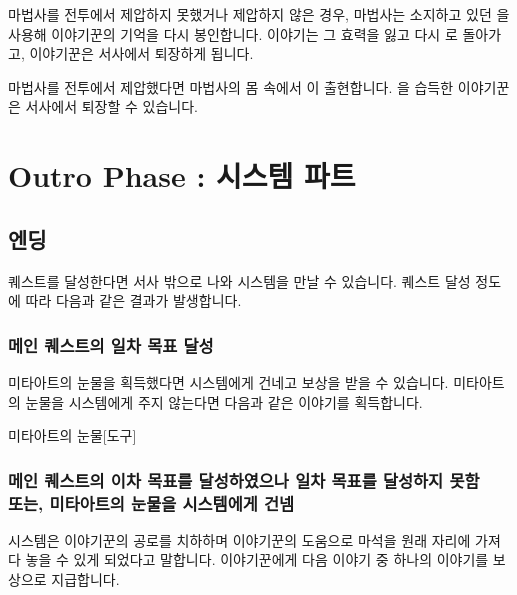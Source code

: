 \documentclass{report}
\begin{document}
	마법사를 전투에서 제압하지 못했거나 제압하지 않은 경우, 마법사는 소지하고 있던 을 사용해 이야기꾼의 기억을 다시 봉인합니다.  이야기는 그 효력을 잃고 다시 로 돌아가고, 이야기꾼은 서사에서 퇴장하게 됩니다.
	
	마법사를 전투에서 제압했다면 마법사의 몸 속에서 이 출현합니다. 을 습득한 이야기꾼은 서사에서 퇴장할 수 있습니다.
	
	
	
	\section{Outro Phase : 시스템 파트}
	
	\subsection{엔딩}
	
	퀘스트를 달성한다면 서사 밖으로 나와 시스템을 만날 수 있습니다. 퀘스트 달성 정도에 따라 다음과 같은 결과가 발생합니다.
	
	
	\subsubsection{메인 퀘스트의 일차 목표 달성}
	
	미타아트의 눈물을 획득했다면 시스템에게 건네고 보상을 받을 수 있습니다. 미타아트의 눈물을 시스템에게 주지 않는다면 다음과 같은 이야기를 획득합니다.
	
	\begin{story}[teardrop]{미타아트의 눈물}{[도구]}
		
	\end{story}
	
	\subsubsection{메인 퀘스트의 이차 목표를 달성하였으나 일차 목표를 달성하지 못함\\또는, 미타아트의 눈물을 시스템에게 건넴}
	
	시스템은 이야기꾼의 공로를 치하하며 이야기꾼의 도움으로 마석을 원래 자리에 가져다 놓을 수 있게 되었다고 말합니다. 이야기꾼에게 다음 이야기 중 하나의 이야기를 보상으로 지급합니다.
	
\end{document}
